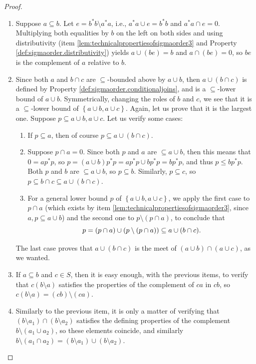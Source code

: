 \begin{proof}
\begin{enumerate}[label={\ref{lem:technicalpropertiesofsigmaorder\arabic*}}]
        \item Suppose $a\subseteq b$. Let $e=b^*b\setminus a^*a$, i.e., $a^*a\cup e=b^*b$ and $a^*a\cap e=0$. Multiplying both equalities by $b$ on the left on both sides and using distributivity (item \ref{lem:technicalpropertiesofsigmaorder3} and Property \ref{def:sigmaorder.distributivity}) yields $a\cup(be)=b$ and $a\cap(be)=0$, so $be$ is the complement of $a$ relative to $b$.
        
        \item Since both $a$ and $b\cap c$ are $\subseteq$-bounded above by $a\cup b$, then $a\cup(b\cap c)$ is defined by Property \ref{def:sigmaorder.conditionaljoins}, and is a $\subseteq$-lower bound of $a\cup b$. Symmetrically, changing the roles of $b$ and $c$, we see that it is a $\subseteq$-lower bound of $\left\{a\cup b,a\cup c\right\}$. Again, let us prove that it is the largest one. Suppose $p\subseteq a\cup b,a\cup c$. Let us verify some cases:
        \begin{enumerate}[label=(\arabic*)]
            \item If $p\subseteq a$, then of course $p\subseteq a\cup(b\cap c)$.
            \item Suppose $p\cap a=0$. Since both $p$ and $a$ are $\subseteq a\cup b$, then this means that $0=ap^*p$, so $p=(a\cup b)p^*p=ap^*p\cup bp^*p=bp^*p$, and thus $p\leq bp^*p$. Both $p$ and $b$ are $\subseteq a\cup b$, so $p\subseteq b$. Similarly, $p\subseteq c$, so $p\subseteq b\cap c\subseteq a\cup(b\cap c)$.
            \item For a general lower bound $p$ of $\left\{a\cup b,a\cup c\right\}$, we apply the first case to $p\cap a$ (which exists by item \ref{lem:technicalpropertiesofsigmaorder3}, since $a,p\subseteq a\cup b$) and the second one to $p\setminus(p\cap a)$, to conclude that
            \[p=(p\cap a)\cup(p\setminus(p\cap a))\subseteq a\cup(b\cap c).\qedhere\]
        \end{enumerate}
        The last case proves that $a\cup(b\cap c)$ is the meet of $(a\cup b)\cap(a\cup c)$, as we wanted.
        \item If $a\subseteq b$ and $c\in S$, then it is easy enough, with the previous items, to verify that $c(b\setminus a)$ satisfies the properties of the complement of $ca$ in $cb$, so $c(b\setminus a)=(cb)\setminus(ca)$.
        \item Similarly to the previous item, it is only a matter of verifying that $(b\setminus a_1)\cap(b\setminus a_2)$ satisfies the defining properties of the complement $b\setminus (a_1\cup a_2)$, so these elements coincide, and similarly $b\setminus (a_1\cap a_2)=(b\setminus a_1)\cup(b\setminus a_2)$.\qedhere
    \end{enumerate}
\end{proof}

